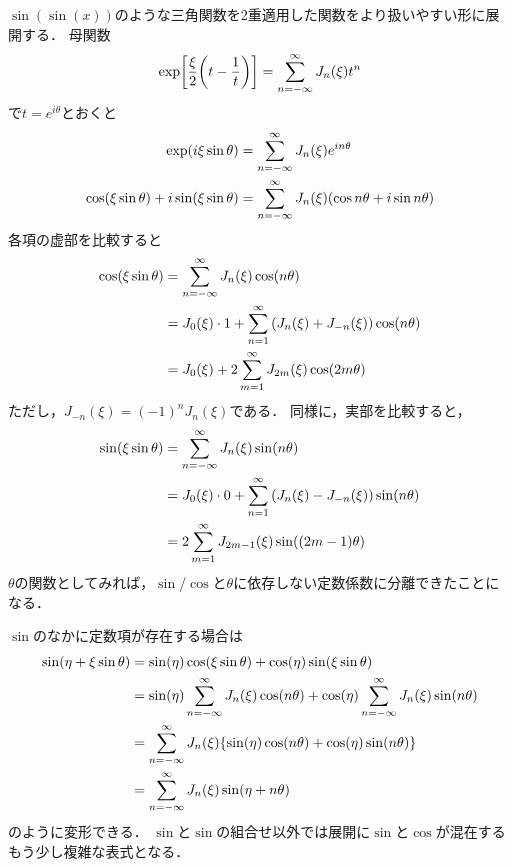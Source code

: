 \documentclass[dvipdfmx,autodetect-engine,12pt,fleqn]{jsarticle}
\begin{document}
$\sin(\sin(x))$のような三角関数を2重適用した関数をより扱いやすい形に展開する．
母関数
\begin{equation*}
    \exp\sbra*{\frac{\xi}{2}\qty(t-\frac{1}{t})} = \sum_{n=-\infty}^\infty J_n(\xi)t^n
\end{equation*}
で$t=e^{i\theta}$とおくと
\begin{equation}
\begin{split}
    \exp\lparen i\xi \sin\theta\rparen &= \sum_{n=-\infty}^\infty J_n(\xi)e^{in\theta}\\
    \cos\lparen\xi \sin\theta\rparen+i\sin\lparen\xi \sin\theta\rparen &= \sum_{n=-\infty}^\infty J_n(\xi)\lparen\cos{n\theta}+i\sin{n\theta}\rparen
\end{split}
\end{equation}
各項の虚部を比較すると
\begin{equation}
\begin{split}
    \cos\rbra*{\xi \sin\theta} &= \sum_{n=-\infty}^\infty J_n(\xi)\cos\rbra{n\theta}\\
    &= J_0(\xi) \cdot 1+ \sum_{n=1}^\infty \qty(J_n(\xi)+J_{-n}(\xi))\cos\rbra{n\theta}\\
    &= J_0(\xi) + 2\sum_{m=1}^\infty J_{2m}(\xi)\cos\rbra{2m\theta}
\end{split}
\end{equation}
ただし，$J_{-n}(\xi)=(-1)^nJ_n(\xi)$である．
同様に，実部を比較すると，
\begin{equation}
\begin{split}
    \sin\rbra*{\xi \sin\theta} &= \sum_{n=-\infty}^\infty J_n(\xi)\sin\rbra{n\theta}\\
    &= J_0(\xi)\cdot 0 + \sum_{n=1}^\infty \qty(J_n(\xi)-J_{-n}(\xi))\sin\rbra{n\theta}\\
    &= 2\sum_{m=1}^\infty J_{2m-1}(\xi)\sin\rbra{(2m-1)\theta}
\end{split}
\end{equation}
$\theta$の関数としてみれば，$\sin$/$\cos$と$\theta$に依存しない定数係数に分離できたことになる．

$\sin$のなかに定数項が存在する場合は
\begin{equation}
\label{eq:bessel-series-sinsin}
\begin{split}
    \sin\rbra*{\eta + \xi \sin\theta} &= \sin(\eta)\cos(\xi\sin\theta)+\cos(\eta)\sin(\xi\sin\theta)\\
    &= \sin(\eta)\sum_{n=-\infty}^\infty J_n(\xi)\cos(n\theta) + \cos(\eta)\sum_{n=-\infty}^\infty J_n(\xi)\sin(n\theta)\\
    &= \sum_{n=-\infty}^\infty J_n(\xi) \qty{\sin(\eta)\cos(n\theta) + \cos(\eta)\sin(n\theta)}\\
    &= \sum_{n=-\infty}^\infty J_n(\xi) \sin\rbra*{\eta + n\theta}
\end{split}
\end{equation}
のように変形できる．
$\sin$と$\sin$の組合せ以外では展開に$\sin$と$\cos$が混在するもう少し複雑な表式となる．
\end{document}
